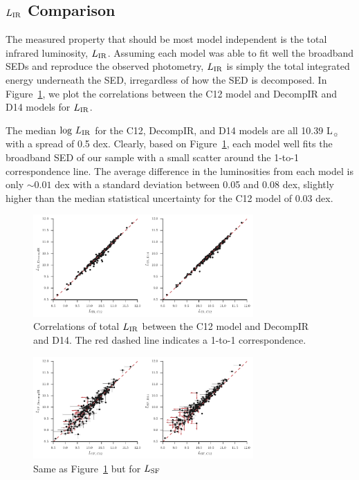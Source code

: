 \documentclass[fleqn, usenatbib]{mnras}
\newcommand{\lsun}{L$_{\sun}$}
\begin{document}
\subsection{$L_{\rm IR}$ Comparison}
The measured property that should be most model independent is the total infrared luminosity, $L_{\rm IR}$. Assuming each model was able to fit well the broadband SEDs and reproduce the observed photometry, $L_{\rm IR}$ is simply the total integrated energy underneath the SED, irregardless of how the SED is decomposed. In Figure~\ref{fig:lir_total_comp}, we plot the correlations between the C12 model and DecompIR and D14 models for $L_{\rm IR}$.  

The median $\log\,L_{\rm IR}$ for the C12, DecompIR, and D14 models are all 10.39 \lsun with a spread of 0.5 dex. Clearly, based on Figure~\ref{fig:lir_total_comp}, each model well fits the broadband SED of our sample with a small scatter around the 1-to-1 correspondence line. The average difference in the luminosities from each model is only $\sim0.01$ dex with a standard deviation between 0.05 and 0.08 dex, slightly higher than the median statistical uncertainty for the C12 model of 0.03 dex.  

\begin{figure}
\includegraphics[width=0.75\textwidth]{figures/lir_total-comparison_nokde}
\caption{Correlations of total $L_{\rm IR}$ between the C12 model and DecompIR and D14. The red dashed line indicates a 1-to-1 correspondence.\label{fig:lir_total_comp}}
\end{figure}

\begin{figure}
\includegraphics[width=0.75\textwidth]{figures/lir_sf-comparison_nokde}
\caption{Same as Figure~\ref{fig:lir_total_comp} but for $L_{\rm SF}$ \label{fig:lir_sf_comp}}
\end{figure}
\end{document}
